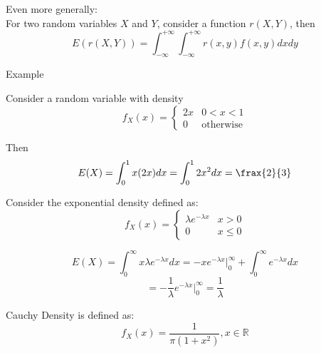 \documentclass{report}
\begin{document}
\begin{description}
\begin{mdframed}
            \vspace{10}

            Even more generally:
            \\
            For two random variables $X$ and $Y$, consider
            a function $r(X,Y)$, then
            \begin{displaymath}
                E(r(X,Y)) = 
                \int_{-\infty}^{+\infty} \int_{-\infty}^{+\infty} r(x,y)f(x,y) dx dy
            \end{displaymath}
        \end{mdframed}
        \pagebreak
    \item {\large Example}
        \begin{mdframed}
            Consider a random variable with density
            \begin{displaymath}
                f_X(x) = 
                \begin{cases}
                    2x & 0 < x < 1\\ 
                    0 & \textrm{otherwise}
                \end{cases}
            \end{displaymath}

            Then
            \begin{displaymath}
                E(X) = 
                \int_0^1 x(2x) dx
                =
                \int_0^1 2x^2dx = \frax{2}{3}
            \end{displaymath}
        \end{mdframed}
        \begin{mdframed}
            Consider the exponential density defined as:
            \begin{displaymath}
                f_X(x) = 
                \begin{cases}
                    \lambda e^{-\lambda x} & x > 0\\ 
                    0 & x \le 0
                \end{cases}
            \end{displaymath}

            \begin{displaymath}
                E(X) = 
                \int_{0}^{\infty} x \lambda e^{-\lambda x} dx
                = -xe^{-\lambda x} \bigg |_0^{\infty} +
                \int_0^{\infty} e^{-\lambda x}dx
            \end{displaymath}
            \begin{displaymath}
                = -\frac{1}{\lambda} e^{-\lambda x} \bigg |_0^{\infty}
                = \frac{1}{\lambda}
            \end{displaymath}
        \end{mdframed}
        \begin{mdframed}
            Cauchy Density is defined as:
            \begin{displaymath}
                f_X(x) =
                \frac{1}{\pi(1+x^2)}, x \in \mathbb{R}
            \end{displaymath}
            

\end{mdframed}
\end{description}
\end{document}
